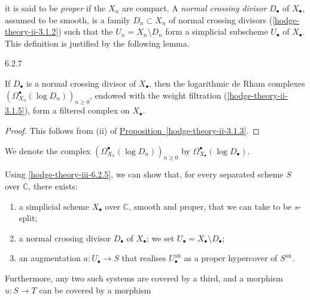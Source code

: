     it is said to be \emph{proper} if the \(X_n\) are compact.
    A \emph{normal crossing divisor} \(D_\bullet \) of \(X_\bullet \), assumed to be smooth, is a family \(D_n\subset  X_n\) of normal crossing divisors (\cref{hodge-theory-ii-3.1.2}) such that the \(U_n=X_n\setminus  D_n\) form a simplicial subscheme \(U_\bullet \) of \(X_\bullet \).
    This definition is justified by the following lemma.\begin{lemma}{6.2.7}\label{hodge-theory-iii-6.2.7}\skipsinglepar\par{}If \(D_\bullet \) is a normal crossing divisor of \(X_\bullet \), then the logarithmic de Rham complexes \((\Omega _{X_n}^\bullet (\log  D_n))_{n\geqslant 0}\), endowed with the weight filtration (\cref{hodge-theory-ii-3.1.5}), form a filtered complex on \(X_\bullet \).\begin{proof}\par{}This follows from (ii) of \hyperref[hodge-theory-ii-3.1.3]{Proposition~\ref*{hodge-theory-ii-3.1.3}}.\end{proof}\par{}We denote the complex \((\Omega _{X_n}^\bullet (\log  D_n))_{n\geqslant 0}\) by \(\Omega _{X_\bullet }^\bullet (\log  D_\bullet )\).\end{lemma}\label{hodge-theory-iii-6.2.8}\par{}Using \cref{hodge-theory-iii-6.2.5}, we can show that, for every separated scheme \(S\) over \(\mathbb {C}\), there exists:

    
 \begin{enumerate}
      
 \item[(𝛼)]
        
        a simplicial scheme \(X_\bullet \) over \(\mathbb {C}\), smooth and proper, that we can take to be \(s\)-split;
      

      
 \item[(𝛽)]
        a normal crossing divisor \(D_\bullet \) of \(X_\bullet \); we set \(U_\bullet =X_\bullet \setminus  D_\bullet \);
      

      
 \item[(𝛾)]
        an augmentation \(a\colon  U_\bullet \to  S\) that realises \(U_\bullet ^\mathrm {an}\) as a proper hypercover of \(S^\mathrm {an}\).
      

    \end{enumerate}\par{}Furthermore, any two such systems are covered by a third, and a morphism \(u\colon  S\to  T\) can be covered by a morphism
    
